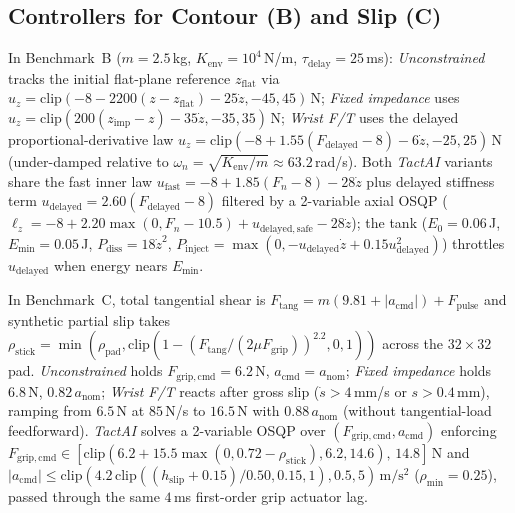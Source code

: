 \documentclass[letterpaper,10pt,conference]{IEEEtran}
\begin{document}
\subsection{Controllers for Contour (B) and Slip (C)}
In Benchmark~B ($m=2.5$\,kg, $K_{\mathrm{env}}=10^4$\,N/m, $\tau_{\mathrm{delay}}=25$\,ms): \emph{Unconstrained} tracks the initial flat-plane reference $z_{\mathrm{flat}}$ via $u_z=\mathrm{clip}(-8-2200(z-z_{\mathrm{flat}})-25\dot z,-45,45)$\,N; \emph{Fixed impedance} uses $u_z=\mathrm{clip}(200(z_{\mathrm{imp}}-z)-35\dot z,-35,35)$\,N; \emph{Wrist F/T} uses the delayed proportional-derivative law $u_z=\mathrm{clip}(-8+1.55(F_{\mathrm{delayed}}-8)-6\dot z,-25,25)$\,N (under-damped relative to $\omega_n=\sqrt{K_{\mathrm{env}}/m}\approx63.2$\,rad/s). Both \emph{TactAI} variants share the fast inner law $u_{\mathrm{fast}}=-8+1.85(F_n-8)-28\dot z$ plus delayed stiffness term $u_{\mathrm{delayed}}=2.60(F_{\mathrm{delayed}}-8)$ filtered by a 2-variable axial OSQP ($\ell_z=-8+2.20\max(0,F_n-10.5)+u_{\mathrm{delayed,safe}}-28\dot z$); the tank ($E_0=0.06$\,J, $E_{\min}=0.05$\,J, $P_{\mathrm{diss}}=18\dot z^2$, $P_{\mathrm{inject}}=\max(0,-u_{\mathrm{delayed}}\dot z+0.15u_{\mathrm{delayed}}^2)$) throttles $u_{\mathrm{delayed}}$ when energy nears $E_{\min}$.

In Benchmark~C, total tangential shear is $F_{\mathrm{tang}}=m(9.81+|a_{\mathrm{cmd}}|)+F_{\mathrm{pulse}}$ and synthetic partial slip takes $\rho_{\mathrm{stick}}=\min(\rho_{\mathrm{pad}},\mathrm{clip}(1-(F_{\mathrm{tang}}/(2\mu F_{\mathrm{grip}}))^{2.2},0,1))$ across the $32\times32$ pad. \emph{Unconstrained} holds $F_{\mathrm{grip,cmd}}=6.2$\,N, $a_{\mathrm{cmd}}=a_{\mathrm{nom}}$; \emph{Fixed impedance} holds $6.8$\,N, $0.82\,a_{\mathrm{nom}}$; \emph{Wrist F/T} reacts after gross slip ($\dot s>4$\,mm/s or $s>0.4$\,mm), ramping from $6.5$\,N at $85$\,N/s to $16.5$\,N with $0.88\,a_{\mathrm{nom}}$ (without tangential-load feedforward). \emph{TactAI} solves a 2-variable OSQP over $(F_{\mathrm{grip,cmd}},a_{\mathrm{cmd}})$ enforcing $F_{\mathrm{grip,cmd}}\in[\mathrm{clip}(6.2+15.5\max(0,0.72-\rho_{\mathrm{stick}}),6.2,14.6),\,14.8]$\,N and $|a_{\mathrm{cmd}}|\le\mathrm{clip}(4.2\,\mathrm{clip}((h_{\mathrm{slip}}+0.15)/0.50,0.15,1),0.5,5)\,\mathrm{m/s^2}$ ($\rho_{\min}=0.25$), passed through the same $4$\,ms first-order grip actuator lag.

\makeatletter
\newenvironment{auditTable}{\par\medskip\noindent\begin{minipage}{\columnwidth}
  \def\@captype{table}\centering\setlength{\tabcolsep}{3pt}}
  {\end{minipage}\par\medskip}
\makeatother
\clearpage
\end{document}
